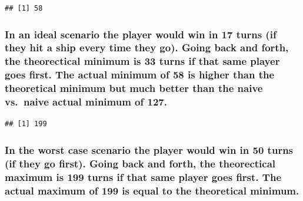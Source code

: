 \documentclass[
]{article}
\newenvironment{Shaded}{\begin{snugshade}}{\end{snugshade}}
\newcommand{\CommentTok}[1]{\textcolor[rgb]{0.56,0.35,0.01}{\textit{#1}}}
\newcommand{\ControlFlowTok}[1]{\textcolor[rgb]{0.13,0.29,0.53}{\textbf{#1}}}
\newcommand{\DecValTok}[1]{\textcolor[rgb]{0.00,0.00,0.81}{#1}}
\newcommand{\FunctionTok}[1]{\textcolor[rgb]{0.13,0.29,0.53}{\textbf{#1}}}
\newcommand{\NormalTok}[1]{#1}
\newcommand{\SpecialCharTok}[1]{\textcolor[rgb]{0.81,0.36,0.00}{\textbf{#1}}}
\begin{document}
\begin{Shaded}
\end{Shaded}

\begin{verbatim}
## [1] 58
\end{verbatim}

\subsubsection{In an ideal scenario the player would win in 17 turns (if
they hit a ship every time they go). Going back and forth, the
theorectical minimum is 33 turns if that same player goes first. The
actual minimum of 58 is higher than the theoretical minimum but much
better than the naive vs.~naive actual minimum of
127.}\label{in-an-ideal-scenario-the-player-would-win-in-17-turns-if-they-hit-a-ship-every-time-they-go.-going-back-and-forth-the-theorectical-minimum-is-33-turns-if-that-same-player-goes-first.-the-actual-minimum-of-58-is-higher-than-the-theoretical-minimum-but-much-better-than-the-naive-vs.-naive-actual-minimum-of-127.}

\begin{Shaded}
\end{Shaded}

\begin{verbatim}
## [1] 199
\end{verbatim}

\subsubsection{In the worst case scenario the player would win in 50
turns (if they go first). Going back and forth, the theorectical maximum
is 199 turns if that same player goes first. The actual maximum of 199
is equal to the theoretical
minimum.}\label{in-the-worst-case-scenario-the-player-would-win-in-50-turns-if-they-go-first.-going-back-and-forth-the-theorectical-maximum-is-199-turns-if-that-same-player-goes-first.-the-actual-maximum-of-199-is-equal-to-the-theoretical-minimum.-1}
\end{document}
